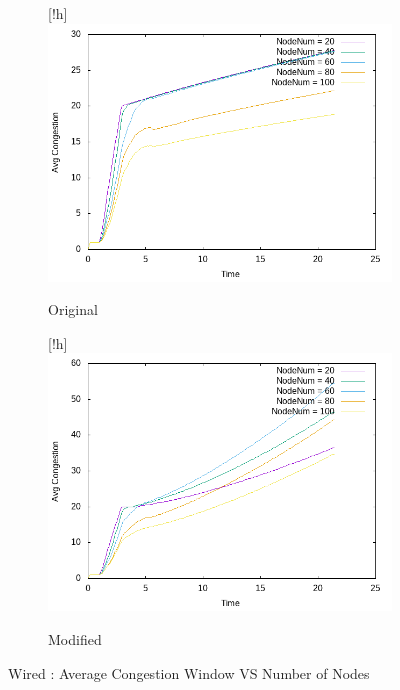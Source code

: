     \begin{figure}[!h]
    	\centering
    	
    	\begin{subfigure}{0.9\textwidth}[!h] %
    		\includegraphics[width=.95\textwidth]{Pictures/Wired/Original/Avg_CongestionVSNodeNum.png}
    		\caption{Original} %
    	\end{subfigure}
    	
    	\vspace{1em} %
    	
    	\begin{subfigure}{0.9\textwidth}[!h] %
    		\includegraphics[width=.95\textwidth]{Pictures/Wired/Modified/Avg_CongestionVSNodeNum.png}
    		\caption{Modified} %
    	\end{subfigure}
    	
    	\caption{Wired : Average Congestion Window VS Number of Nodes} %
    \end{figure}
    
